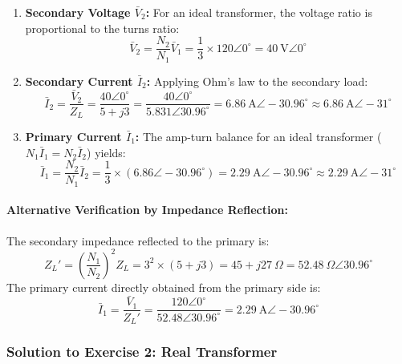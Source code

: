 \begin{enumerate}
    \item \textbf{Secondary Voltage $\bar{V}_2$:}
    For an ideal transformer, the voltage ratio is proportional to the turns ratio:
    \begin{equation}
        \bar{V}_2 = \frac{N_2}{N_1} \bar{V}_1 = \frac{1}{3} \times 120\angle 0^\circ = 40\ \text{V}\angle 0^\circ
    \end{equation}

    \item \textbf{Secondary Current $\bar{I}_2$:}
    Applying Ohm's law to the secondary load:
    \begin{equation}
        \bar{I}_2 = \frac{\bar{V}_2}{Z_L} = \frac{40\angle 0^\circ}{5 + j3} = \frac{40\angle 0^\circ}{5.831\angle 30.96^\circ} = 6.86\ \text{A} \angle -30.96^\circ \approx 6.86\ \text{A} \angle -31^\circ
    \end{equation}

    \item \textbf{Primary Current $\bar{I}_1$:}
    The amp-turn balance for an ideal transformer ($N_1 \bar{I}_1 = N_2 \bar{I}_2$) yields:
    \begin{equation}
        \boxed{\bar{I}_1 = \frac{N_2}{N_1} \bar{I}_2 = \frac{1}{3} \times (6.86\angle -30.96^\circ) = 2.29\ \text{A} \angle -30.96^\circ \approx 2.29\ \text{A} \angle -31^\circ}
    \end{equation}
\end{enumerate}

\paragraph{Alternative Verification by Impedance Reflection:}
The secondary impedance reflected to the primary is:
\[
Z_L' = \left(\frac{N_1}{N_2}\right)^2 Z_L = 3^2 \times (5 + j3) = 45 + j27\ \Omega = 52.48\ \Omega \angle 30.96^\circ
\]
The primary current directly obtained from the primary side is:
\[
\bar{I}_1 = \frac{\bar{V}_1}{Z_L'} = \frac{120\angle 0^\circ}{52.48\angle 30.96^\circ} = 2.29\ \text{A} \angle -30.96^\circ
\]

\subsubsection*{Solution to Exercise 2: Real Transformer}
